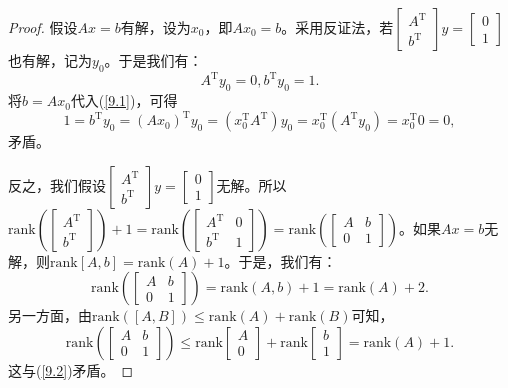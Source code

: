 \documentclass[UTF8]{ctexart}
\begin{document}
\begin{proof}
	假设$Ax =b$有解，设为$x_0$，即$Ax_0 = b$。采用反证法，若$\begin{bmatrix}
		A^{\mathrm{T}} \\
		b^{\mathrm{T}} 
	\end{bmatrix} y= \begin{bmatrix}
		0 \\
		1 
	\end{bmatrix}$也有解，记为$y_0$。于是我们有：
	\begin{equation}\label{9.1}
		A^{\mathrm{T}} y_0 = 0 , b^{\mathrm{T}} y_0 = 1.
	\end{equation}
	将$b  =Ax_0$代入(\ref{9.1})，可得
	\[
	1 = b^{\mathrm{T}} y_0 = (Ax_0)^{\mathrm{T}} y_0 = (x_0^{\mathrm{T}}  A^{\mathrm{T}}) y_0 = x_0^{\mathrm{T}}  (A^{\mathrm{T}} y_0) = x_0^{\mathrm{T}} 0  = 0,
	\]
	矛盾。
	\
	
	反之，我们假设$\begin{bmatrix}
		A^{\mathrm{T}} \\
		b^{\mathrm{T}} 
	\end{bmatrix} y= \begin{bmatrix}
		0 \\
		1 
	\end{bmatrix}$无解。所以$\mathrm{rank}(\begin{bmatrix}
		A^{\mathrm{T}} \\
		b^{\mathrm{T}} 
	\end{bmatrix}) +1 = \mathrm{rank}(\begin{bmatrix}
		A^{\mathrm{T}} & 0\\
		b^{\mathrm{T}}  & 1
	\end{bmatrix}) = \mathrm{rank}(\begin{bmatrix}
		A & b\\
		0  & 1
	\end{bmatrix})$。如果$Ax =b$无解，则$\mathrm{rank}[A, b] = \mathrm{rank}(A) + 1$。于是，我们有：
	\begin{equation} \label{9.2}
		\mathrm{rank}(\begin{bmatrix}
			A & b\\
			0  & 1
		\end{bmatrix}) = \mathrm{rank}(A, b) + 1 = \mathrm{rank}(A) + 2.
	\end{equation}
	另一方面，由$\mathrm{rank}([A, B]) \leq \mathrm{rank}(A)+\mathrm{rank}(B)$可知，\[\mathrm{rank}(\begin{bmatrix}
		A & b\\
		0  & 1
	\end{bmatrix}) \leq \mathrm{rank}\begin{bmatrix}
		A \\
		0 
	\end{bmatrix} + \mathrm{rank}\begin{bmatrix}
		b \\
		1 
	\end{bmatrix} = \mathrm{rank}(A) + 1.\]
	这与(\ref{9.2})矛盾。
\end{proof}
\end{document}
